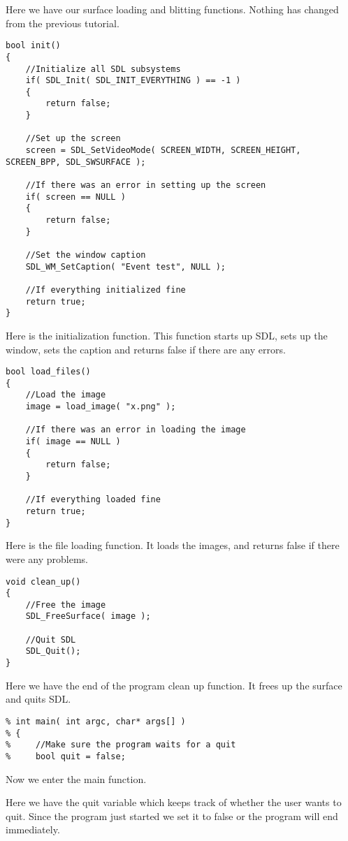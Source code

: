 Here we have our surface loading and blitting functions. Nothing has changed
from the previous tutorial.

\begin{verbatim}
bool init()
{
    //Initialize all SDL subsystems
    if( SDL_Init( SDL_INIT_EVERYTHING ) == -1 )
    {
        return false;
    }

    //Set up the screen
    screen = SDL_SetVideoMode( SCREEN_WIDTH, SCREEN_HEIGHT, SCREEN_BPP, SDL_SWSURFACE );

    //If there was an error in setting up the screen
    if( screen == NULL )
    {
        return false;
    }

    //Set the window caption
    SDL_WM_SetCaption( "Event test", NULL );

    //If everything initialized fine
    return true;
}
\end{verbatim}

Here is the initialization function. This function starts up SDL, sets up the
window, sets the caption and returns false if there are any errors.

\begin{verbatim}
bool load_files()
{
    //Load the image
    image = load_image( "x.png" );

    //If there was an error in loading the image
    if( image == NULL )
    {
        return false;
    }

    //If everything loaded fine
    return true;
}
\end{verbatim}

Here is the file loading function. It loads the images, and returns false if
there were any problems.

\begin{verbatim}
void clean_up()
{
    //Free the image
    SDL_FreeSurface( image );

    //Quit SDL
    SDL_Quit();
}
\end{verbatim}

Here we have the end of the program clean up function. It frees up the surface
and quits SDL.

\begin{verbatim}
% int main( int argc, char* args[] )
% {
%     //Make sure the program waits for a quit
%     bool quit = false;
\end{verbatim}

Now we enter the main function.

Here we have the quit variable which keeps track of whether the user wants to
quit. Since the program just started we set it to false or the program will end
immediately.

